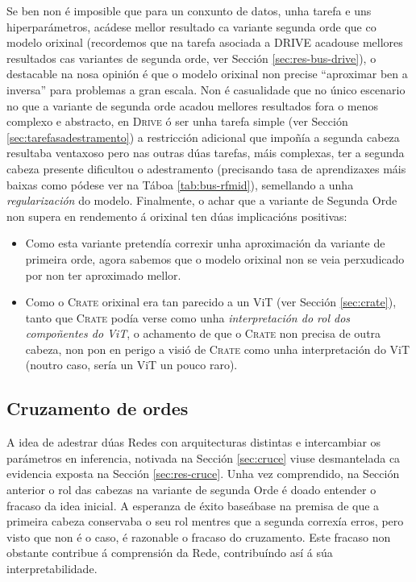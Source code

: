 Se ben non é imposible que para un conxunto de datos, unha tarefa e uns hiperparámetros, acádese mellor resultado ca variante segunda orde que co modelo orixinal (recordemos que na tarefa asociada a DRIVE acadouse mellores resultados cas variantes de segunda orde, ver Sección \ref{sec:res-bus-drive}), o destacable na nosa opinión é que o modelo orixinal non precise ``aproximar ben a inversa'' para problemas a gran escala. Non é casualidade que no único escenario no que a variante de segunda orde acadou mellores resultados fora o menos complexo e abstracto, en \textsc{Drive} ó ser unha tarefa simple (ver Sección \ref{sec:tarefasadestramento}) a restricción adicional que impoñía a segunda cabeza resultaba ventaxoso pero nas outras dúas tarefas, máis complexas, ter a segunda cabeza presente dificultou o adestramento (precisando \glspl{tasa de aprendizaxe} máis baixas como pódese ver na Táboa \ref{tab:bus-rfmid}), semellando a unha \emph{regularización} do modelo. Finalmente, o achar que a variante de Segunda Orde non supera en rendemento á orixinal ten dúas implicacións positivas:
\begin{itemize}
				\item Como esta variante pretendía correxir unha aproximación da variante de primeira orde, agora sabemos que o modelo orixinal non se veia perxudicado por non ter aproximado mellor.
				\item Como o \textsc{Crate} orixinal era tan parecido a un ViT (ver Sección \ref{sec:crate}), tanto que \textsc{Crate} podía verse como unha \emph{interpretación do rol dos compoñentes do ViT}, o achamento de que o \textsc{Crate} non precisa de outra cabeza, non pon en perigo a visió de \textsc{Crate} como unha interpretación do ViT (noutro caso, sería un ViT un pouco raro).
\end{itemize}

\subsection{Cruzamento de ordes}
\label{sec:con-cruce}

A idea de adestrar dúas Redes con arquitecturas distintas e intercambiar os parámetros en inferencia, notivada na Sección \ref{sec:cruce} viuse desmantelada ca evidencia exposta na Sección \ref{sec:res-cruce}. Unha vez comprendido, na Sección anterior o rol das cabezas na variante de segunda Orde é doado entender o fracaso da idea inicial. A esperanza de éxito baseábase na premisa de que a primeira cabeza conservaba o seu rol mentres que a segunda correxía erros, pero visto que non é o caso, é razonable o fracaso do cruzamento. Este fracaso non obstante contribue á comprensión da Rede, contribuíndo así á súa \gls{interpretabilidade}.


